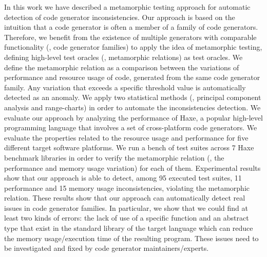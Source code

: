 In this work we have described a metamorphic testing approach for automatic detection of code generator inconsistencies.
Our approach is based on the intuition that a code generator is often a member of a family of code generators. Therefore, we benefit from the existence of multiple generators with comparable functionality (\ie, code generator families) to apply the idea of metamorphic testing, defining high-level test oracles (\ie, metamorphic relations) as test oracles. 
We define the metamorphic relation as a comparison between the variations of performance and resource usage of code, generated from the same code generator family. Any variation that exceeds a specific threshold value is automatically detected as an anomaly. We apply two statistical methods (\ie, principal component analysis and range-charts) in order to automate the inconsistencies detection.
We evaluate our approach by analyzing the performance of Haxe, a popular high-level programming language that involves a set of cross-platform code generators. We evaluate the properties related to the resource usage and performance for five different target software platforms. 
We run a bench of test suites across 7 Haxe benchmark libraries in order to verify the metamorphic relation (\ie, the performance and memory usage variation) for each of them. Experimental results show that our approach is able to detect, among 95 executed test suites, 11 performance and 15 memory usage inconsistencies, violating the metamorphic relation. These results show that our approach can automatically detect real issues in code generator families. In particular, we show that we could find at least two kinds of errors: the lack of use of a specific function and an abstract type that exist in the standard library of the target language which can reduce the memory usage/execution time of the resulting program. These issues need to be investigated and fixed by code generator maintainers/experts.















